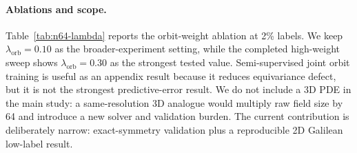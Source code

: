 \paragraph{Ablations and scope.} Table~\ref{tab:n64-lambda} reports the orbit-weight ablation at 2\% labels. We keep \(\lambda_{\mathrm{orb}}=0.10\) as the broader-experiment setting, while the completed high-weight sweep shows \(\lambda_{\mathrm{orb}}=0.30\) as the strongest tested value. Semi-supervised joint orbit training is useful as an appendix result because it reduces equivariance defect, but it is not the strongest predictive-error result. We do not include a 3D PDE in the main study: a same-resolution 3D analogue would multiply raw field size by 64 and introduce a new solver and validation burden. The current contribution is deliberately narrow: exact-symmetry validation plus a reproducible 2D Galilean low-label result.

